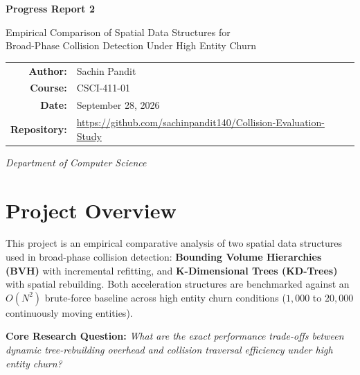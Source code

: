 \documentclass[12pt]{article}
\begin{document}
\begin{titlepage}
    \centering
    \vspace*{2cm}

    {\LARGE\bfseries Progress Report 2\par}
    \vspace{0.5cm}
    {\large Empirical Comparison of Spatial Data Structures for\\
    Broad-Phase Collision Detection Under High Entity Churn\par}

    \vspace{2cm}

    \begin{tabular}{rl}
        \textbf{Author:}     & Sachin Pandit \\[6pt]
        \textbf{Course:}     & CSCI-411-01   \\[6pt]
        \textbf{Date:}       & September 28, 2026 \\[6pt]
        \textbf{Repository:} & \url{https://github.com/sachinpandit140/Collision-Evaluation-Study} \\
    \end{tabular}

    \vfill

    \textit{Department of Computer Science}

\end{titlepage}


\section{Project Overview}

This project is an empirical comparative analysis of two spatial data structures used in broad-phase collision detection: \textbf{Bounding Volume Hierarchies (BVH)} with incremental refitting, and \textbf{K-Dimensional Trees (KD-Trees)} with spatial rebuilding. Both acceleration structures are benchmarked against an $O(N^2)$ brute-force baseline across high entity churn conditions ($1{,}000$ to $20{,}000$ continuously moving entities).

\textbf{Core Research Question:} \textit{What are the exact performance trade-offs between dynamic tree-rebuilding overhead and collision traversal efficiency under high entity churn?}
\end{document}
